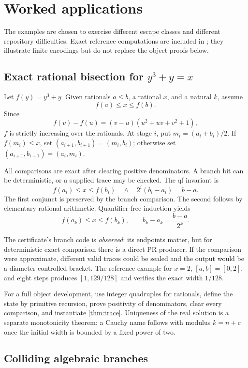 \section{Worked applications}
\label{sec:examples}

The examples are chosen to exercise different escape classes and different
repository difficulties.  Exact reference computations are included in
; they illustrate finite encodings but do not
replace the object proofs below.

\subsection{Exact rational bisection for \(y^3+y=x\)}

Let \(f(y)=y^3+y\).  Given rationals \(a\le b\), a rational \(x\), and a
natural \(k\), assume
\[
       f(a)\le x\le f(b).
\]
Since
\[
 f(v)-f(u)=(v-u)(u^2+uv+v^2+1),
\]
\(f\) is strictly increasing over the rationals.  At stage \(i\), put
\(m_i=(a_i+b_i)/2\).  If \(f(m_i)\le x\), set
\((a_{i+1},b_{i+1})=(m_i,b_i)\); otherwise set
\((a_{i+1},b_{i+1})=(a_i,m_i)\).

All comparisons are exact after clearing positive denominators.  A branch bit
can be deterministic, or a supplied trace may be checked.  The qf invariant is
\[
 f(a_i)\le x\le f(b_i)
 \quad\wedge\quad
 2^i(b_i-a_i)=b-a.
\]
The first conjunct is preserved by the branch comparison.  The second follows
by elementary rational arithmetic.  Quantifier-free induction yields
\[
 f(a_k)\le x\le f(b_k),
 \qquad b_k-a_k=\frac{b-a}{2^k}.
\]

The certificate's branch code is \emph{observed}: its endpoints matter, but
for deterministic exact comparison there is a direct PR producer.  If the
comparison were approximate, different valid traces could be sealed and the
output would be a diameter-controlled bracket.  The reference example for
\(x=2\), \([a,b]=[0,2]\), and eight steps produces \([1,129/128]\) and verifies
the exact width \(1/128\).

For a full object development, use integer quadruples for rationals, define the
state by primitive recursion, prove positivity of denominators, clear every
comparison, and instantiate \cref{thm:trace}.  Uniqueness of the real solution
is a separate monotonicity theorem; a Cauchy name follows with modulus
\(k=n+c\) once the initial width is bounded by a fixed power of two.

\subsection{Colliding algebraic branches}


